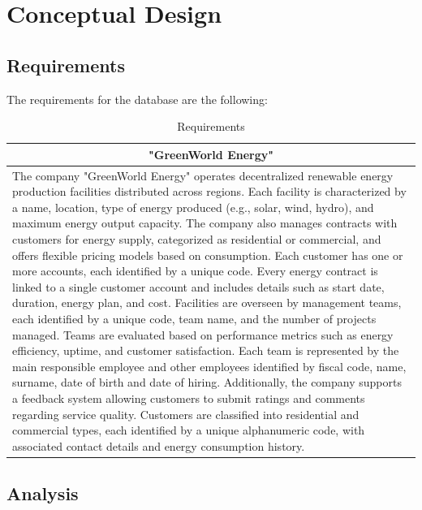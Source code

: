 \section{Conceptual Design}
\subsection{Requirements}
The requirements for the database are the following:\begin{table}[H]
    \renewcommand{\arraystretch}{1.3} %
    \begin{tabularx}{\textwidth}{|X|}
    \hline
    \multicolumn{1}{|c|}{\textbf{"GreenWorld Energy"}} \\ \hline
    The company "GreenWorld Energy" operates decentralized renewable energy production facilities distributed 
    across regions. Each facility is characterized by a name, location, type of energy produced (e.g., solar, wind, 
    hydro), and maximum energy output capacity. The company also manages contracts with customers for energy 
    supply, categorized as residential or commercial, and offers flexible pricing models based on consumption. 
    Each customer has one or more accounts, each identified by a unique code. Every energy contract is linked to a 
    single customer account and includes details such as start date, duration, energy plan, and cost. Facilities are 
    overseen by management teams, each identified by a unique code, team name, and the number of projects managed. 
    Teams are evaluated based on performance metrics such as energy efficiency, uptime, and customer satisfaction. 
    Each team is represented by the main responsible employee and other employees identified by fiscal code, name, 
    surname, date of birth and date of hiring. Additionally, the company supports a feedback system allowing 
    customers to submit ratings and comments regarding service quality. Customers are classified into residential and 
    commercial types, each identified by a unique alphanumeric code, with associated contact details and energy 
    consumption history. \\ \hline
    \end{tabularx}
    \caption{Requirements}
\end{table}


\subsection{Analysis}

